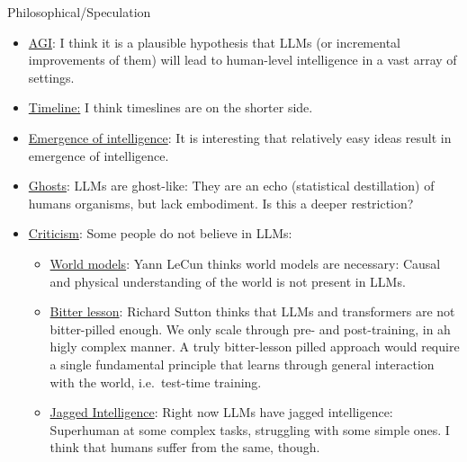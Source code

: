 \begin{frame}{Philosophical/Speculation}
	\begin{itemize}
		\item \underline{AGI}: I think it is a plausible hypothesis that LLMs (or incremental improvements of them) will lead to human-level intelligence in a vast array of settings.
		\item \underline{Timeline:} I think timeslines are on the shorter side.
		\item \underline{Emergence of intelligence}: It is interesting that relatively easy ideas result in emergence of intelligence.
		\item \underline{Ghosts}: LLMs are ghost-like: They are an echo (statistical destillation) of humans organisms, but lack embodiment. Is this a deeper restriction?
		\item \underline{Criticism}: Some people do not believe in LLMs:
			\begin{itemize}
				\item \underline{World models}: Yann LeCun thinks world models are necessary: Causal and physical understanding of the world is not present in LLMs.
				\item \underline{Bitter lesson}: Richard Sutton thinks that LLMs and transformers are not bitter-pilled enough. We only scale through pre- and post-training, in ah higly complex manner. A truly bitter-lesson pilled approach would require a single fundamental principle that learns through general interaction with the world, i.e.\ test-time training.
				\item \underline{Jagged Intelligence}: Right now LLMs have jagged intelligence: Superhuman at some complex tasks, struggling with some simple ones. I think that humans suffer from the same, though.
			\end{itemize}
	\end{itemize}
\end{frame}
